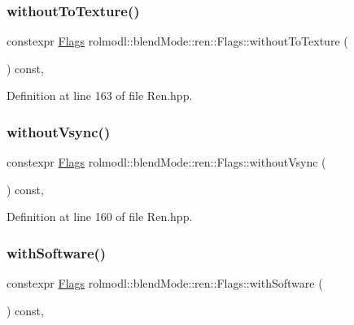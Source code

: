 \subsubsection{\texorpdfstring{withoutToTexture()}{withoutToTexture()}}
{\footnotesize\ttfamily constexpr \mbox{\hyperlink{structrolmodl_1_1blend_mode_1_1ren_1_1_flags}{Flags}} rolmodl\+::blend\+Mode\+::ren\+::\+Flags\+::without\+To\+Texture (\begin{DoxyParamCaption}{ }\end{DoxyParamCaption}) const\hspace{0.3cm}{\ttfamily [inline]}, {\ttfamily [noexcept]}}



Definition at line 163 of file Ren.\+hpp.

\mbox{\label{structrolmodl_1_1blend_mode_1_1ren_1_1_flags_a5b86e3989727c71182e51af747071af1}} 
\subsubsection{\texorpdfstring{withoutVsync()}{withoutVsync()}}
{\footnotesize\ttfamily constexpr \mbox{\hyperlink{structrolmodl_1_1blend_mode_1_1ren_1_1_flags}{Flags}} rolmodl\+::blend\+Mode\+::ren\+::\+Flags\+::without\+Vsync (\begin{DoxyParamCaption}{ }\end{DoxyParamCaption}) const\hspace{0.3cm}{\ttfamily [inline]}, {\ttfamily [noexcept]}}



Definition at line 160 of file Ren.\+hpp.

\mbox{\label{structrolmodl_1_1blend_mode_1_1ren_1_1_flags_a54303f482f6adf2a2bd05f03cee191eb}} 
\subsubsection{\texorpdfstring{withSoftware()}{withSoftware()}}
{\footnotesize\ttfamily constexpr \mbox{\hyperlink{structrolmodl_1_1blend_mode_1_1ren_1_1_flags}{Flags}} rolmodl\+::blend\+Mode\+::ren\+::\+Flags\+::with\+Software (\begin{DoxyParamCaption}{ }\end{DoxyParamCaption}) const\hspace{0.3cm}{\ttfamily [inline]}, {\ttfamily [noexcept]}}



